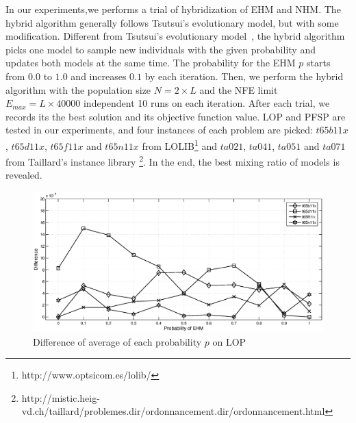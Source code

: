 In our experiments,we performs a trial of hybridization of EHM and NHM. The hybrid algorithm generally follows Tsutsui's evolutionary model, but with some modification. Different from Tsutsui's evolutionary model~\citep{tsutsui2006comparative}, the hybrid algorithm picks one model to sample new individuals with the given probability and updates both models at the same time. The probability for the EHM $p$ starts from $0.0$ to $1.0$ and increases $0.1$ by each iteration. Then, we perform the hybrid algorithm with the population size $N = 2 \times L$ and the NFE limit $E_{max} = L \times 40000$ independent 10 runs on each iteration. After each trial, we records its the best solution and its objective function value. LOP and PFSP are tested in our experiments, and four instances of each problem are picked: $t65b11x$,  $t65d11x$, $t65f11x$ and $t65n11x$ from LOLIB\footnote{http://www.optsicom.es/lolib/} and  $ta021$, $ta041$, $ta051$ and $ta071$ from Taillard's instance library \footnote{http://mistic.heig-vd.ch/taillard/problemes.dir/ordonnancement.dir/ordonnancement.html}. In the end, the best mixing ratio of models is revealed. 




\begin{figure}[t]
    \includegraphics[width=1.0\textwidth]{img/sweep_lop.eps}

    \caption{Difference of average of each probability $p$ on LOP}
    \label{fig:sweep_lop}
\end{figure}










